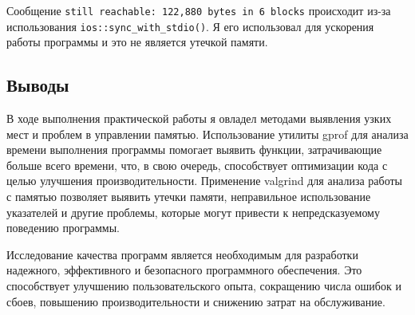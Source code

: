 \documentclass[12pt]{article}
\begin{document}
Сообщение \texttt{still reachable: 122,880 bytes in 6 blocks} происходит из-за использования \texttt{ios::sync\_with\_stdio()}.
Я его использовал для ускорения работы программы и это не является утечкой памяти.

\newpage
\subsection*{Выводы}

В ходе выполнения практической работы я овладел методами выявления узких мест и проблем в управлении памятью. 
Использование утилиты gprof для анализа времени выполнения программы помогает выявить функции, затрачивающие больше всего времени, что, в свою очередь, способствует оптимизации кода с целью улучшения производительности. 
Применение valgrind для анализа работы с памятью позволяет выявить утечки памяти, неправильное использование указателей и другие проблемы, которые могут привести к непредсказуемому поведению программы.

Исследование качества программ является необходимым для разработки надежного, эффективного и безопасного программного обеспечения. 
Это способствует улучшению пользовательского опыта, сокращению числа ошибок и сбоев, повышению производительности и снижению затрат на обслуживание.
\end{document}
